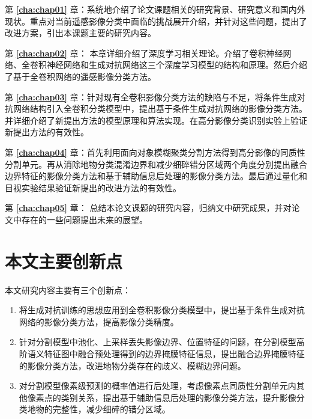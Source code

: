 第 \textbf{\ref{cha:chap01}} 章：系统地介绍了论文课题相关的研究背景、研究意义和国内外现状。重点对当前遥感影像分类中面临的挑战展开介绍，并针对这些问题，提出了改进方案，引出本课题主要的研究内容。

第 \textbf{\ref{cha:chap02}} 章： 本章详细介绍了深度学习相关理论。介绍了卷积神经网络、全卷积神经网络和生成对抗网络这三个深度学习模型的结构和原理。然后介绍了基于全卷积网络的遥感影像分类方法。


第 \textbf{\ref{cha:chap03}} 章：针对现有全卷积影像分类方法的缺陷与不足，将条件生成对抗网络结构引入全卷积分类模型中，提出基于条件生成对抗网络的影像分类方法。并详细介绍了新提出方法的模型原理和算法实现。在高分影像分类识别实验上验证新提出方法的有效性。

第 \textbf{\ref{cha:chap04}} 章：首先利用面向对象模糊聚类分割方法得到高分影像的同质性分割单元。再从消除地物分类混淆边界和减少细碎错分区域两个角度分别提出融合边界特征的影像分类方法和基于辅助信息后处理的影像分类方法。最后通过量化和目视实验结果验证新提出的改进方法的有效性。

第 \textbf{\ref{cha:chap05}} 章： 总结本论文课题的研究内容，归纳文中研究成果，并对论文中存在的一些问题提出未来的展望。


\section{本文主要创新点}
\label{sec:forth}
本文研究内容主要有三个创新点：
\begin{enumerate}[(1)]
    \item 将生成对抗训练的思想应用到全卷积影像分类模型中，提出基于条件生成对抗网络的影像分类方法，提高影像分类精度。
    \item 针对分割模型中池化、上采样丢失影像边界、位置特征的问题，在分割模型高阶语义特征图中融合预处理得到的边界掩膜特征信息，提出融合边界掩膜特征的影像分类方法，改进地物分类存在的歧义、模糊边界问题。
    \item 对分割模型像素级预测的概率值进行后处理，考虑像素点同质性分割单元内其他像素点的类别关系，提出基于辅助信息后处理的影像分类方法，提升影像分类地物的完整性，减少细碎的错分区域。

\end{enumerate}
